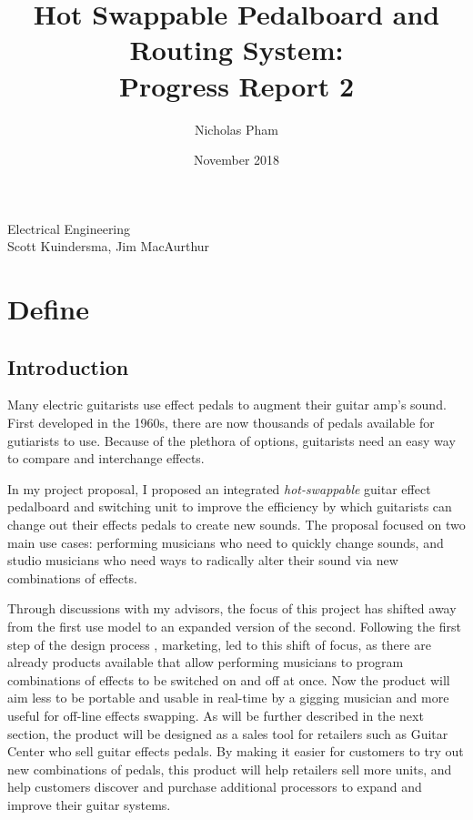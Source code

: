 \documentclass{article}
\title{Hot Swappable Pedalboard and Routing System:\\Progress Report 2}
\author{Nicholas Pham}
\date{November 2018}
\begin{document}
\maketitle
\begin{center}
    Electrical Engineering \\
    Scott Kuindersma, Jim MacAurthur
\end{center}

\newpage
\glsaddall
\printglossaries
\newpage

\section{Define}
	\subsection{Introduction}
	\color{gray}
	Many electric guitarists use effect pedals to augment their guitar amp's sound.  First developed in the 1960s, there are now thousands of pedals available for gutiarists to use.  Because of the plethora of options, guitarists need an easy way to compare and interchange effects.

	In my project proposal, I proposed an integrated \emph{hot-swappable} guitar effect pedalboard and switching unit to improve the efficiency by which guitarists can change out their effects pedals to create new sounds.  The proposal focused on two main use cases: performing musicians who need to quickly change sounds, and studio musicians who need ways to radically alter their sound via new combinations of effects.

	Through discussions with my advisors, the focus of this project has shifted away from the first use model to an expanded version of the second.  Following the first step of the design process \cite{ES100Lec3}, marketing, led to this shift of focus, as there are already products available that allow performing musicians to program combinations of effects to be switched on and off at once.  Now the product will aim less to be portable and usable in real-time by a gigging musician and more useful for off-line effects swapping.  As will be further described in the next section, the product will be designed as a sales tool for retailers such as Guitar Center who sell guitar effects pedals.  By making it easier for customers to try out new combinations of pedals, this product will help retailers sell more units, and help customers discover and purchase additional processors to expand and improve their guitar systems.
	\color{black}
\end{document}
